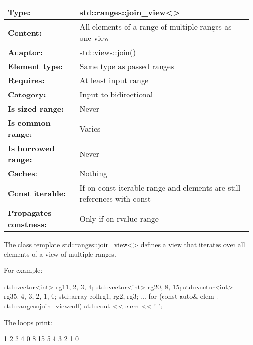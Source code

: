 \begin{longtable}[c]{|l|l|}
\hline
\textbf{Type:}           & std::ranges::join\_view\textless{}\textgreater{}                        \\ \hline
\endfirsthead
%
\endhead
%
\textbf{Content:}        & All elements of a range of multiple ranges as one view                  \\ \hline
\textbf{Adaptor:}              & std::views::join()         \\ \hline
\textbf{Element type:}         & Same type as passed ranges \\ \hline
\textbf{Requires:}             & At least input range       \\ \hline
\textbf{Category:}             & Input to bidirectional     \\ \hline
\textbf{Is sized range:}       & Never                      \\ \hline
\textbf{Is common range:}      & Varies                     \\ \hline
\textbf{Is borrowed range:}    & Never                      \\ \hline
\textbf{Caches:}               & Nothing                    \\ \hline
\textbf{Const iterable:} & If on const-iterable range and elements are still references with const \\ \hline
\textbf{Propagates constness:} & Only if on rvalue range    \\ \hline
\end{longtable}

The class template std::ranges::join\_view<> defines a view that iterates over all elements of a view of multiple ranges.

For example:

\begin{cpp}
std::vector<int> rg1{1, 2, 3, 4};
std::vector<int> rg2{0, 8, 15};
std::vector<int> rg3{5, 4, 3, 2, 1, 0};
std::array coll{rg1, rg2, rg3};
...
for (const auto& elem : std::ranges::join_view{coll}) {
	std::cout << elem << ' ';
}
\end{cpp}

The loops print:

\begin{shell}
1 2 3 4 0 8 15 5 4 3 2 1 0
\end{shell}

